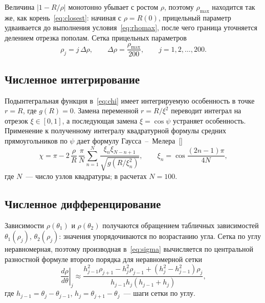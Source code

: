 \documentclass[a4paper,14pt]{extarticle}
\newcommand{\citeitem}[1]{\citesep\ref{#1}\def\citesep{,~}}
\newcommand{\cit}[1]{[\def\citesep{}\forcsvlist{\citeitem}{#1}]}
\begin{document}
Величина $|1 - R/\rho|$ монотонно убывает с ростом $\rho$, поэтому
$\rho_{\max}$ находится так же, как корень~\eqref{eq:closest}: начиная
с $\rho = R(0)$, прицельный параметр удваивается до выполнения
условия~\eqref{eq:rhomax}, после чего граница уточняется делением отрезка
пополам. Сетка прицельных параметров
\begin{equation}
  \rho_j = j\,\Delta\rho, \qquad \Delta\rho = \frac{\rho_{\max}}{200},
  \qquad j = 1, 2, \ldots, 200.
  \label{eq:grid}
\end{equation}

\subsection{Численное интегрирование}

Подынтегральная функция в~\eqref{eq:chi} имеет интегрируемую особенность
в точке $r = R$, где $g(R) = 0$. Замена переменной $r = R/\xi^2$
переводит интеграл на отрезок $\xi \in [0, 1]$, а последующая замена
$\xi = \cos\psi$ устраняет особенность. Применение к полученному интегралу
квадратурной формулы средних прямоугольников по $\psi$ дает формулу
Гаусса~--~Мелера~\cit{ref:manual}
\begin{equation}
  \chi = \pi - 2\,\frac{\rho}{R}\,\frac{\pi}{N}
  \sum_{n=1}^{N} \frac{\xi_n \xi_{N-n+1}}{\sqrt{g\left(R/\xi_n^2\right)}},
  \qquad
  \xi_n = \cos\frac{(2n - 1)\pi}{4N},
  \label{eq:gauss}
\end{equation}
где $N$~--- число узлов квадратуры; в расчетах $N = 100$.

\subsection{Численное дифференцирование}

Зависимости $\rho(\theta_1)$ и $\rho(\theta_2)$ получаются обращением
табличных зависимостей $\theta_1(\rho_j)$, $\theta_2(\rho_j)$: значения
упорядочиваются по возрастанию угла. Сетка по углу неравномерная,
поэтому производная в~\eqref{eq:sigma} вычисляется по центральной
разностной формуле второго порядка для неравномерной сетки
\begin{equation}
  \left.\frac{d\rho}{d\theta}\right|_{j} \approx
  \frac{h_{j-1}^2 \rho_{j+1} - h_j^2 \rho_{j-1} + \left(h_j^2 - h_{j-1}^2\right)\rho_j}
       {h_{j-1} h_j \left(h_{j-1} + h_j\right)},
  \label{eq:derivative}
\end{equation}
где $h_{j-1} = \theta_j - \theta_{j-1}$, $h_j = \theta_{j+1} - \theta_j$~---
шаги сетки по углу.
\end{document}
